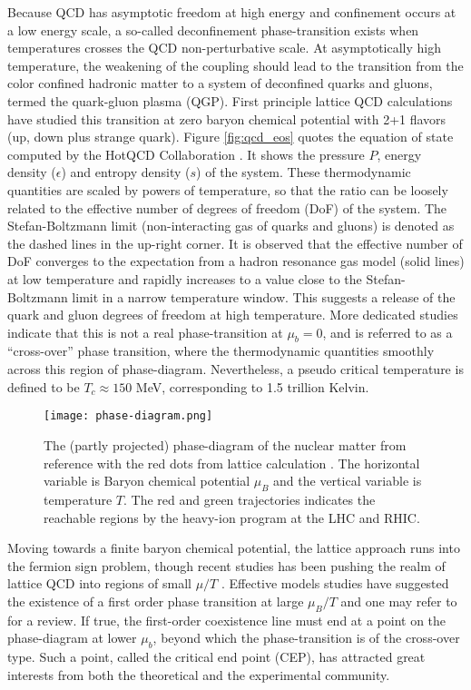 Because QCD has asymptotic freedom at high energy and confinement occurs at a low energy scale, a so-called deconfinement phase-transition exists when temperatures crosses the QCD non-perturbative scale.
At asymptotically high temperature, the weakening of the coupling should lead to the transition from the color confined hadronic matter to a system of deconfined quarks and gluons, termed the quark-gluon plasma (QGP). 
First principle lattice QCD calculations have studied this transition at zero baryon chemical potential with 2+1 flavors (up, down plus strange quark).
Figure \ref{fig:qcd_eos} quotes the equation of state computed by the HotQCD Collaboration \cite{Bazavov:2014pvz}.
It shows the pressure $P$, energy density ($\epsilon$) and entropy density ($s$) of the system.
These thermodynamic quantities are scaled by powers of temperature, so that the ratio can be loosely related to the effective number of degrees of freedom (DoF) of the system.
The Stefan-Boltzmann limit (non-interacting gas of quarks and gluons) is denoted as the dashed lines in the up-right corner.
It is observed that the effective number of DoF converges to the expectation from a hadron resonance gas model (solid lines) at low temperature and rapidly increases to a value close to the Stefan-Boltzmann limit in a narrow temperature window.
This suggests a release of the quark and gluon degrees of freedom at high temperature.
More dedicated studies indicate that this is not a real phase-transition at $\mu_b = 0$, and is referred to as a ``cross-over'' phase transition, where the thermodynamic quantities smoothly across this region of phase-diagram.
Nevertheless, a pseudo critical temperature is defined to be $T_c \approx 150 $ MeV, corresponding to 1.5 trillion Kelvin.

\begin{figure}
\singlespacing 
    \centering
    \texttt{[image: phase-diagram.png]}
    \caption[The (partly projected) phase-diagram of the nuclear matter from]{The (partly projected) phase-diagram of the nuclear matter from reference \cite{Geesaman:2015fha} with the red dots from lattice calculation \cite{PhysRevLett.109.192302}. The horizontal variable is Baryon chemical potential $\mu_B$ and the vertical variable is temperature $T$. The red and green trajectories indicates the reachable regions by the heavy-ion program at the LHC and RHIC.}
    \label{fig:phase-diagram}
\end{figure}

Moving towards a finite baryon chemical potential, the lattice approach runs into the fermion sign problem, though recent studies has been pushing the realm of lattice QCD into regions of small $\mu/T$  \cite{Gunther:2016vcp,Bazavov:2017dus}.
Effective models studies have suggested the existence of a first order phase transition at large $\mu_B/T$ and one may refer to \cite{Fukushima:2010bq} for a review.
If true, the first-order coexistence line must end at a point on the phase-diagram at lower $\mu_b$, beyond which the phase-transition is of the cross-over type.
Such a point, called the critical end point (CEP), has attracted great interests from both the theoretical and the experimental community.

